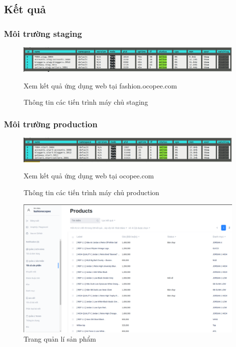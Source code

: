 \fontsize{13px}{13px}\selectfont\justifying

\subsection{Kết quả}
\subsubsection{Môi trường \Gls{staging}}
\FloatBarrier
\begin{figure}[!htbp]\fontsize{13px}{13px}\selectfont
\centering
		\includegraphics[width=\textwidth]{./results/vps-staging}
		\caption{Thông tin các tiến trình máy chủ \gls{staging}}
\justifying
Xem kết quả ứng dụng web tại fashion.ocopee.com
\end{figure}
\subsubsection{Môi trường \Gls{production}}
\FloatBarrier
\begin{figure}[!htbp]\fontsize{13px}{13px}\selectfont
\centering
		\includegraphics[width=\textwidth]{./results/vps-production}
		\caption{Thông tin các tiến trình máy chủ \gls{production}}
\justifying
Xem kết quả ứng dụng web tại ocopee.com
\end{figure}
\FloatBarrier
\begin{figure}[!htbp]\fontsize{13px}{13px}\selectfont
\centering
		\includegraphics[width=\textwidth]{./results/product}
		\caption{Trang quản lí sản phẩm}
\justifying
\end{figure}
\clearpage
